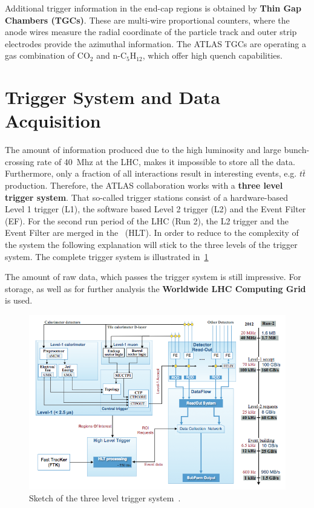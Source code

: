 Additional trigger information in the end-cap regions is obtained by \textbf{Thin Gap Chambers (TGCs)}. These are multi-wire proportional counters, where the anode wires 
measure the radial coordinate of the particle track and outer strip electrodes provide the azimuthal information. The ATLAS TGCs are operating a gas combination of CO$_2$ and n-C$_5$H$_{12}$, which offer high quench capabilities.


\section{Trigger System and Data Acquisition}


 The amount of information produced due to the  high luminosity and large bunch-crossing rate of 40~Mhz at the LHC, makes it impossible to store all the data. Furthermore, only a fraction of all interactions result in interesting events, e.g. $t\bar{t}$ production. Therefore, the ATLAS collaboration works with a \textbf{three level trigger system}. That so-called trigger stations consist of a hardware-based Level 1 trigger (L1), the software based Level 2 trigger (L2) and the Event Filter (EF). For the second run period of the LHC (Run 2), the L2 trigger and the Event Filter are merged in  the~ (HLT). In order to reduce to the complexity of the system the following explanation will stick to the three levels of the trigger system. The complete trigger system is illustrated in~\cref{fig:38} 

The amount of raw data, which passes the trigger system is still impressive. For storage, as well as for further analysis the \textbf{Worldwide LHC Computing Grid} is used.

\begin{figure}[t]
	\centering
	\includegraphics[width=0.80\linewidth]{trigger}
	\caption{Sketch of the three level trigger system~\cite{Nakahama:2015211}.} 
	\label{fig:38}
\end{figure}



